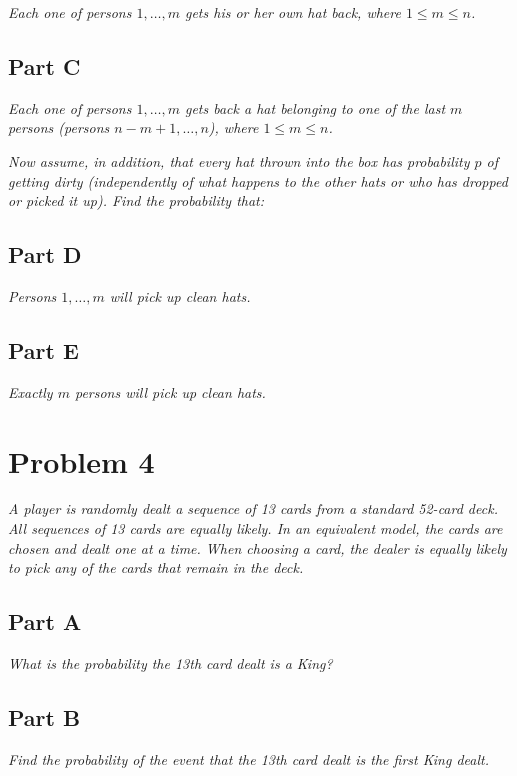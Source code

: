 \documentclass{article}
\begin{document}
\textit{Each one of persons $ 1, \ldots, m $ gets his or her own hat back,
where $ 1 \leq m \leq n $.}

\subsection*{Part C}

\textit{Each one of persons $ 1, \ldots, m $ gets back a hat belonging to one
of the last $ m $ persons (persons $ n - m + 1, \ldots, n $), where $ 1 \leq 
m \leq n $.}

\textit{Now assume, in addition, that every hat thrown into the box has
probability $ p $ of getting dirty (independently of what happens to the
other hats or who has dropped or picked it up). Find the probability that:}

\subsection*{Part D}

\textit{Persons $ 1, \ldots, m $ will pick up clean hats.}

\subsection*{Part E}

\textit{Exactly $ m $ persons will pick up clean hats.}

\section*{Problem 4}

\textit{A player is randomly dealt a sequence of 13 cards from a standard
52-card deck. All sequences of 13 cards are equally likely. In an equivalent
model, the cards are chosen and dealt one at a time. When choosing a card,
the dealer is equally likely to pick any of the cards that remain in the
deck.}

\subsection*{Part A}

\textit{What is the probability the 13th card dealt is a King?}

\subsection*{Part B}

\textit{Find the probability of the event that the 13th card dealt is the
first King dealt.}
\end{document}
